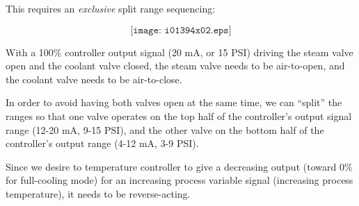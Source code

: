 
This requires an {\it exclusive} split range sequencing:

$$\texttt{[image: i01394x02.eps]}$$

With a 100\% controller output signal (20 mA, or 15 PSI) driving the steam valve open and the coolant valve closed, the steam valve needs to be air-to-open, and the coolant valve needs to be air-to-close.

In order to avoid having both valves open at the same time, we can ``split'' the ranges so that one valve operates on the top half of the controller's output signal range (12-20 mA, 9-15 PSI), and the other valve on the bottom half of the controller's output range (4-12 mA, 3-9 PSI).

Since we desire to temperature controller to give a decreasing output (toward 0\% for full-cooling mode) for an increasing process variable signal (increasing process temperature), it needs to be reverse-acting.











